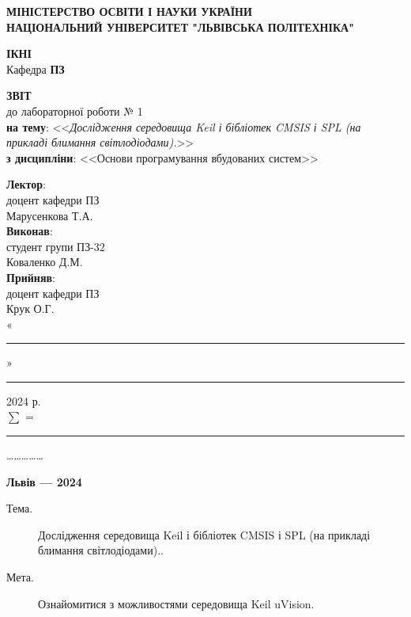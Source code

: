 \documentclass[oneside,14pt]{extarticle}
\newcommand\subject{Основи програмування вбудованих систем}
\newcommand\lecturer{доцент кафедри ПЗ\\Марусенкова Т.А.}
\newcommand\teacher{доцент кафедри ПЗ\\Крук О.Г.}
\newcommand\mygroup{ПЗ-32}
\newcommand\lab{1}
\newcommand\theme{Дослідження середовища Keil і бібліотек CMSIS і SPL (на прикладі блимання світлодіодами).}
\newcommand\purpose{Ознайомитися з можливостями середовища Keil uVision}
\begin{document}
\begin{normalsize}
	\begin{titlepage}
		\thispagestyle{empty}
		\begin{center}
			\textbf{МІНІСТЕРСТВО ОСВІТИ І НАУКИ УКРАЇНИ\\
				НАЦІОНАЛЬНИЙ УНІВЕРСИТЕТ "ЛЬВІВСЬКА ПОЛІТЕХНІКА"}
		\end{center}
		\begin{flushright}
			\textbf{ІКНІ}\\
			Кафедра \textbf{ПЗ}
		\end{flushright}
		\vspace{80pt}
		\begin{center}
			\textbf{ЗВІТ}\\
			\vspace{10pt}
			до лабораторної роботи № \lab\\
			\textbf{на тему}: <<\textit{\theme}>>\\
			\textbf{з дисципліни}: <<\subject>>
		\end{center}
		\vspace{80pt}
		\begin{flushright}
			
			\textbf{Лектор}:\\
			\lecturer\\
			\vspace{28pt}
			\textbf{Виконав}:\\
			
			студент групи \mygroup\\
			Коваленко Д.М.\\
			\vspace{28pt}
			\textbf{Прийняв}:\\
			
			\teacher\\
			
			\vspace{28pt}
			«\rule{1cm}{0.15mm}» \rule{1.5cm}{0.15mm} 2024 р.\\
			$\sum$ = \rule{1cm}{0.15mm}……………\\
			
		\end{flushright}
		\vspace{\fill}
		\begin{center}
			\textbf{Львів — 2024}
		\end{center}
	\end{titlepage}
		
	\begin{description}
		\item[Тема.] \theme.
		\item[Мета.] \purpose.
	\end{description}


\end{normalsize}
\end{document}

